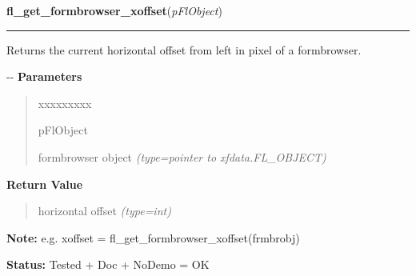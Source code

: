     \vspace{0.5ex}

\hspace{.8\funcindent}\begin{boxedminipage}{\funcwidth}

    \raggedright \textbf{fl\_get\_formbrowser\_xoffset}(\textit{pFlObject})

    \vspace{-1.5ex}

    \rule{\textwidth}{0.5\fboxrule}
\setlength{\parskip}{2ex}

Returns the current horizontal offset from left in pixel of a
formbrowser.

-{}-
\setlength{\parskip}{1ex}
      \textbf{Parameters}
      \vspace{-1ex}

      \begin{quote}
        \begin{Ventry}{xxxxxxxxx}

          \item[pFlObject]


formbrowser object
            {\it (type=pointer to xfdata.FL\_OBJECT)}

        \end{Ventry}

      \end{quote}

      \textbf{Return Value}
    \vspace{-1ex}

      \begin{quote}

horizontal offset
      {\it (type=int)}

      \end{quote}

\textbf{Note:} 
e.g. xoffset = fl\_get\_formbrowser\_xoffset(frmbrobj)


\textbf{Status:} 
Tested + Doc + NoDemo = OK


    \end{boxedminipage}

    \label{xformslib:flformbrowser:fl_get_formbrowser_yoffset}

    \vspace{0.5ex}

